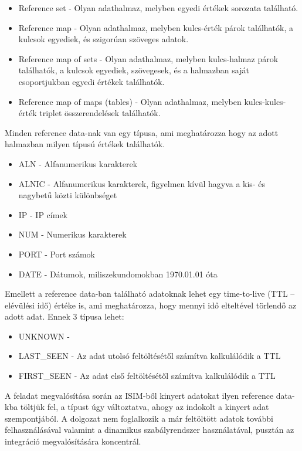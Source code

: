 \begin{itemize}
	\item Reference set - Olyan adathalmaz, melyben egyedi értékek sorozata található.
	\item Reference map - Olyan adathalmaz, melyben kulcs-érték párok találhatók, a kulcsok egyediek, és szigorúan szöveges adatok.
	\item Reference map of sets - Olyan adathalmaz, melyben kulcs-halmaz párok találhatók, a kulcsok egyediek, szövegesek, és a halmazban saját csoportjukban egyedi értékek találhatók.
	\item Reference map of maps (tables) - Olyan adathalmaz, melyben kulcs-kulcs-érték triplet összerendelések találhatók.
\end{itemize}

Minden reference data-nak van egy típusa, ami meghatározza hogy az adott halmazban milyen típusú értékek találhatók.

\begin{itemize}
	\item ALN - Alfanumerikus karakterek
	\item ALNIC - Alfanumerikus karakterek, figyelmen kívül hagyva a kis- és nagybetű közti különbséget 
	\item IP - IP címek
	\item NUM - Numerikus karakterek
	\item PORT - Port számok
	\item DATE - Dátumok, miliszekundomokban 1970.01.01 óta
\end{itemize}

Emellett a reference data-ban található adatoknak lehet egy time-to-live (TTL -- elévülési idő) értéke is, ami meghatározza, hogy mennyi idő elteltével törlendő az adott adat. Ennek 3 típusa lehet: 
\begin{itemize}
	\item UNKNOWN - \todo
	\item LAST\_SEEN - Az adat utolsó feltöltésétől számítva kalkulálódik a TTL
	\item FIRST\_SEEN - Az adat első feltöltésétől számítva kalkulálódik a TTL
\end{itemize}

A feladat megvalósítása során az ISIM-ből kinyert adatokat ilyen reference data-kba töltjük fel, a típust úgy változtatva, ahogy az indokolt a kinyert adat szempontjából. A dolgozat nem foglalkozik a már feltöltött adatok további felhasználásával valamint a dinamikus szabályrendszer használatával, pusztán az integráció megvalósítására koncentrál.

